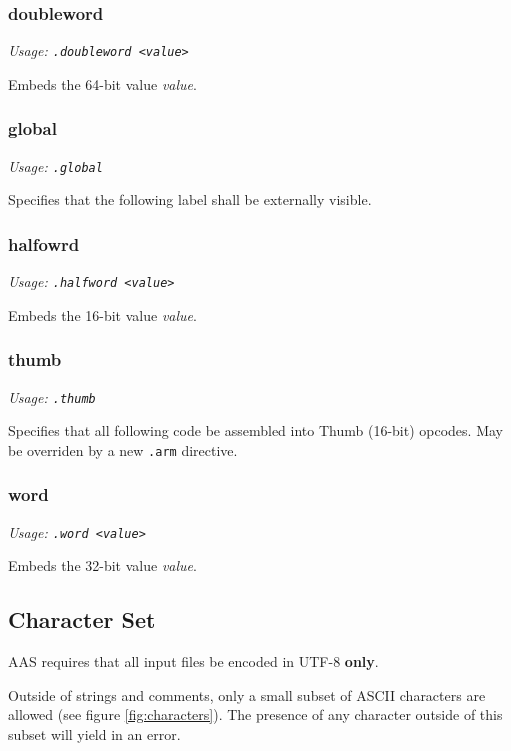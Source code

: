 \documentclass[a4paper]{article}
\begin{document}
			\subsubsection{doubleword}
				\textit{Usage: \texttt{.doubleword <value>}}

				Embeds the 64-bit value \textit{value}.

			\subsubsection{global}
				\textit{Usage: \texttt{.global}}

				Specifies that the following label shall be externally visible.

			\subsubsection{halfowrd}
				\textit{Usage: \texttt{.halfword <value>}}

				Embeds the 16-bit value \textit{value}.

			\subsubsection{thumb}
				\textit{Usage: \texttt{.thumb}}

				Specifies that all following code be assembled into Thumb (16-bit) opcodes. May be overriden by a new \texttt{.arm} directive.

			\subsubsection{word}
				\textit{Usage: \texttt{.word <value>}}

				Embeds the 32-bit value \textit{value}.

		\subsection{Character Set}
			AAS requires that all input files be encoded in UTF-8 \textbf{only}.

			Outside of strings and comments, only a small subset of ASCII characters are allowed (see figure \ref{fig:characters}). The presence of any character outside of this subset will yield in an error.
\end{document}
